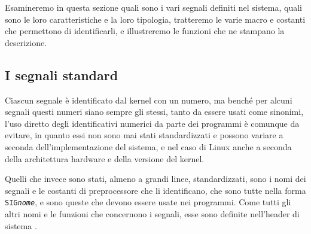 Esamineremo in questa sezione quali sono i vari segnali definiti nel sistema,
quali sono le loro caratteristiche e la loro tipologia, tratteremo le varie
macro e costanti che permettono di identificarli, e illustreremo le funzioni
che ne stampano la descrizione.


\subsection{I segnali standard}
\label{sec:sig_standard}

Ciascun segnale è identificato dal kernel con un numero, ma benché per alcuni
segnali questi numeri siano sempre gli stessi, tanto da essere usati come
sinonimi, l'uso diretto degli identificativi numerici da parte dei programmi è
comunque da evitare, in quanto essi non sono mai stati standardizzati e
possono variare a seconda dell'implementazione del sistema, e nel caso di
Linux anche a seconda della architettura hardware e della versione del kernel.

Quelli che invece sono stati, almeno a grandi linee, standardizzati, sono i
nomi dei segnali e le costanti di preprocessore che li identificano, che sono
tutte nella forma \texttt{SIG\textsl{nome}}, e sono queste che devono essere
usate nei programmi. Come tutti gli altri nomi e le funzioni che concernono i
segnali, esse sono definite nell'header di sistema .

